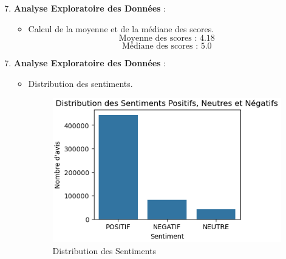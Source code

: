 \begin{frame}
    \begin{enumerate}
        \setcounter{enumi}{6}
        \item \textbf{Analyse Exploratoire des Données} :
            \begin{itemize} 
                \item Calcul de la moyenne et de la médiane des scores.
                \[
                \text{Moyenne des scores : } 4.18
                \]
                \[
                \text{Médiane des scores : } 5.0
                \]
            \end{itemize}
    \end{enumerate}
\end{frame}

\begin{frame}
    \begin{enumerate}
        \setcounter{enumi}{6}
        \item \textbf{Analyse Exploratoire des Données} :
            \begin{itemize}
                \item Distribution des sentiments.
                \begin{figure}[h]
                    \centering
                    \includegraphics[width=0.7\linewidth]{Figures/distrubutiondessentiments.PNG}
                    \captionsetup{font=scriptsize}
                    \caption{Distribution des Sentiments}
                    \label{fig:distribution_des_sentiments}
                \end{figure}
            \end{itemize}
    \end{enumerate}
\end{frame}



